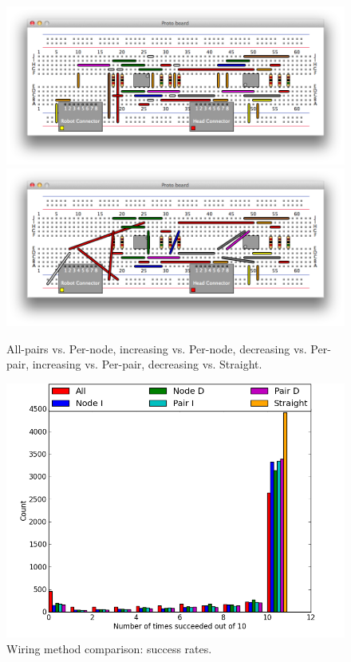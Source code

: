 \begin{figure}[H]
\begin{center}
\includegraphics[width=\textwidth]{Images/exemplar_per_pair_decreasing.png}
\includegraphics[width=\textwidth]{Images/exemplar_straight_wiring.png}
\caption{All-pairs vs. Per-node, increasing vs. Per-node, decreasing vs.
Per-pair, increasing vs. Per-pair, decreasing vs. Straight.}
\end{center}
\end{figure}

\begin{figure}[H]
\begin{center}
\includegraphics[width=\textwidth]{Images/wiring_success_comparison.png}
\caption{Wiring method comparison: success rates.}
\label{fig:wiring_success}
\end{center}
\end{figure}

